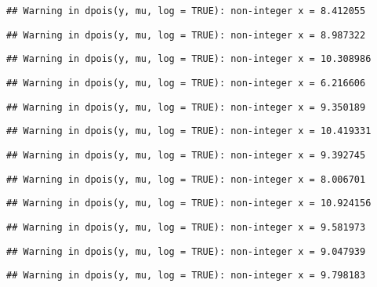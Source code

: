 \documentclass[
]{article}
\begin{document}
\begin{verbatim}
## Warning in dpois(y, mu, log = TRUE): non-integer x = 8.412055
\end{verbatim}

\begin{verbatim}
## Warning in dpois(y, mu, log = TRUE): non-integer x = 8.987322
\end{verbatim}

\begin{verbatim}
## Warning in dpois(y, mu, log = TRUE): non-integer x = 10.308986
\end{verbatim}

\begin{verbatim}
## Warning in dpois(y, mu, log = TRUE): non-integer x = 6.216606
\end{verbatim}

\begin{verbatim}
## Warning in dpois(y, mu, log = TRUE): non-integer x = 9.350189
\end{verbatim}

\begin{verbatim}
## Warning in dpois(y, mu, log = TRUE): non-integer x = 10.419331
\end{verbatim}

\begin{verbatim}
## Warning in dpois(y, mu, log = TRUE): non-integer x = 9.392745
\end{verbatim}

\begin{verbatim}
## Warning in dpois(y, mu, log = TRUE): non-integer x = 8.006701
\end{verbatim}

\begin{verbatim}
## Warning in dpois(y, mu, log = TRUE): non-integer x = 10.924156
\end{verbatim}

\begin{verbatim}
## Warning in dpois(y, mu, log = TRUE): non-integer x = 9.581973
\end{verbatim}

\begin{verbatim}
## Warning in dpois(y, mu, log = TRUE): non-integer x = 9.047939
\end{verbatim}

\begin{verbatim}
## Warning in dpois(y, mu, log = TRUE): non-integer x = 9.798183
\end{verbatim}
\end{document}
